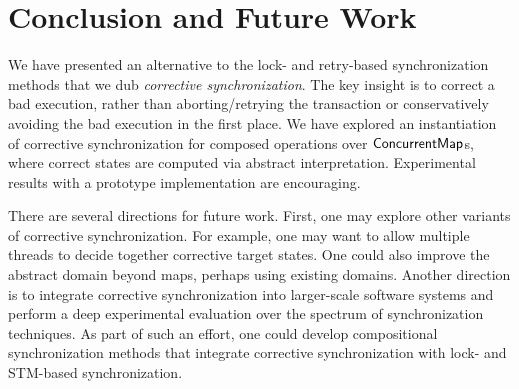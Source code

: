 \section{Conclusion and Future Work}

We have presented an alternative to the lock- and retry-based synchronization methods that we dub \emph{corrective synchronization}. The key insight is to correct a bad execution, rather than aborting/retrying the transaction or conservatively avoiding the bad execution in the first place. We have explored an instantiation of corrective synchronization for composed operations over ${\sf ConcurrentMap}$s, where correct states are computed via abstract interpretation.
%
Experimental results with a prototype implementation are encouraging.

There are several directions for future work.
%
First, one may explore other variants
of corrective synchronization.  For example, one may want to allow
multiple threads to decide together corrective target states.  One
could also improve the abstract domain beyond maps, perhaps using
existing domains.
%
Another direction is to integrate corrective synchronization into larger-scale
software systems and perform a deep experimental evaluation over the spectrum
of synchronization techniques.
As part of such an effort, one could develop compositional synchronization methods that integrate corrective synchronization with lock- and STM-based synchronization.

